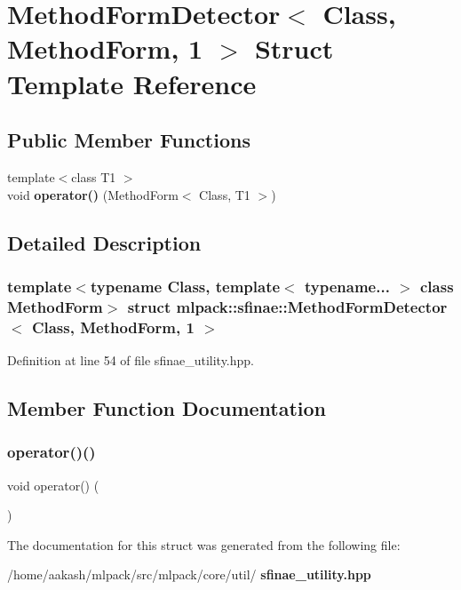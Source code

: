 \section{Method\+Form\+Detector$<$ Class, Method\+Form, 1 $>$ Struct Template Reference}
\label{structmlpack_1_1sfinae_1_1MethodFormDetector_3_01Class_00_01MethodForm_00_011_01_4}
\subsection*{Public Member Functions}
\begin{DoxyCompactItemize}
\item 
{\footnotesize template$<$class T1 $>$ }\\void \textbf{ operator()} (Method\+Form$<$ Class, T1 $>$)
\end{DoxyCompactItemize}


\subsection{Detailed Description}
\subsubsection*{template$<$typename Class, template$<$ typename... $>$ class Method\+Form$>$\newline
struct mlpack\+::sfinae\+::\+Method\+Form\+Detector$<$ Class, Method\+Form, 1 $>$}



Definition at line 54 of file sfinae\+\_\+utility.\+hpp.



\subsection{Member Function Documentation}
\mbox{\label{structmlpack_1_1sfinae_1_1MethodFormDetector_3_01Class_00_01MethodForm_00_011_01_4_a0679ac159700cd7ca1cf00c496a67749}} 
\subsubsection{operator()()}
{\footnotesize\ttfamily void operator() (\begin{DoxyParamCaption}\item[{Method\+Form$<$ Class, T1 $>$}]{ }\end{DoxyParamCaption})}



The documentation for this struct was generated from the following file\+:\begin{DoxyCompactItemize}
\item 
/home/aakash/mlpack/src/mlpack/core/util/\textbf{ sfinae\+\_\+utility.\+hpp}\end{DoxyCompactItemize}

